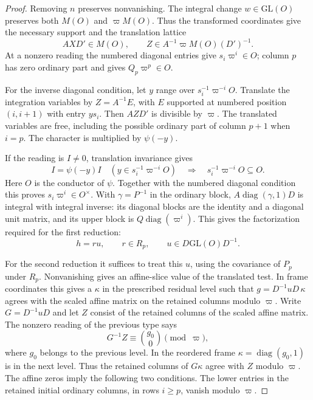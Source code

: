 \begin{proof}
Removing \(n\) preserves
nonvanishing. The integral change \(w\in\mathrm{GL}(O)\) preserves both
\(M(O)\) and \(\varpi M(O)\). Thus the transformed coordinates
give the necessary support and the translation lattice
\[
 AXD'\in M(O),\qquad
 Z\in A^{-1}\varpi M(O)(D')^{-1}.
\] At a nonzero reading the
numbered diagonal entries give \(s_i\varpi^i\in O\); column
\(p\) has zero ordinary part and gives \(Q_p\varpi^p\in O\).

For the inverse diagonal condition, let \(y\) range over
\(s_i^{-1}\varpi^{-i}O\). Translate the integration variables
by \(Z=A^{-1}E\), with \(E\) supported at numbered position
\((i,i+1)\) with entry \(ys_i\). Then \(AZD'\) is divisible
by \(\varpi\). The translated variables are free, including
the possible ordinary part of column \(p+1\) when \(i=p\).
The character is multiplied by \(\psi(-y)\).

If the reading is \(I\ne0\), translation invariance gives
\[
 I=\psi(-y)I\quad(y\in s_i^{-1}\varpi^{-i}O)
 \quad\Longrightarrow\quad s_i^{-1}\varpi^{-i}O\subseteq O .
\]
Here \(O\) is the conductor of \(\psi\). Together with the numbered
diagonal condition this proves \(s_i\varpi^i\in O^\times\). With
\(\gamma=P^{-1}\) in the ordinary block,
\(A\operatorname{diag}(\gamma,1)D\) is integral with
integral inverse: its diagonal blocks are the identity and
a diagonal unit matrix, and its upper block is
\(Q\operatorname{diag}(\varpi^i)\).
This gives the factorization required for the first reduction:
\[
 h=r u,\qquad r\in R_p,\qquad u\in D\mathrm{GL}(O)D^{-1}.
\]

For the second reduction it suffices to treat this \(u\), using
the covariance of \(P_p\) under \(R_p\). Nonvanishing gives an
affine-slice value of the translated test. In frame
coordinates this gives a \(\kappa\) in the prescribed residual
level such that \(g=D^{-1}uD\,\kappa\) agrees with the scaled
affine matrix on the retained columns modulo \(\varpi\).
Write \(G=D^{-1}uD\) and let \(Z\) consist of the retained
columns of the scaled affine matrix. The nonzero reading of the
previous type says
\[
             G^{-1}Z\equiv\binom{g_0}{0}\pmod{\varpi},
\]
where \(g_0\) belongs to the previous level. In the reordered
frame \(\kappa=\operatorname{diag}(g_0,1)\) is in the next level.
Thus the retained columns of \(G\kappa\) agree with \(Z\) modulo
\(\varpi\).
The affine zeros imply the following two
conditions. The lower entries in the retained initial
ordinary columns, in rows \(i\ge p\), vanish modulo
\(\varpi\).


\end{proof}

